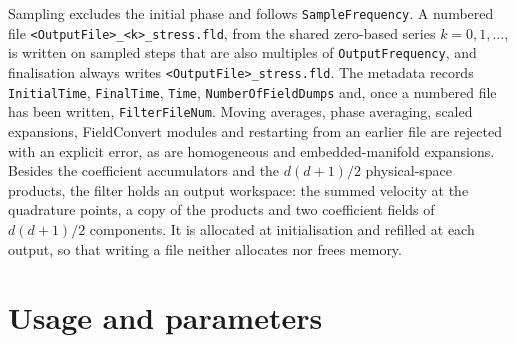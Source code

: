 Sampling excludes the initial phase and follows \texttt{SampleFrequency}. A
numbered file \texttt{<OutputFile>\_<k>\_stress.fld}, from the shared
zero-based series $k = 0, 1, \ldots$, is written on sampled steps that are
also multiples of \texttt{OutputFrequency}, and finalisation always writes
\texttt{<OutputFile>\_stress.fld}. The metadata records
\texttt{InitialTime}, \texttt{FinalTime}, \texttt{Time},
\texttt{NumberOfFieldDumps} and, once a numbered file has been written,
\texttt{FilterFileNum}. Moving averages, phase averaging, scaled expansions,
FieldConvert modules and restarting from an earlier file are rejected with an
explicit error, as are homogeneous and embedded-manifold expansions. Besides
the coefficient accumulators and the $d(d+1)/2$ physical-space products, the
filter holds an output workspace: the summed velocity at the quadrature
points, a copy of the products and two coefficient fields of $d(d+1)/2$
components. It is allocated at initialisation and refilled at each output, so
that writing a file neither allocates nor frees memory.

\section{Usage and parameters}
\label{sec:incns-usage}

